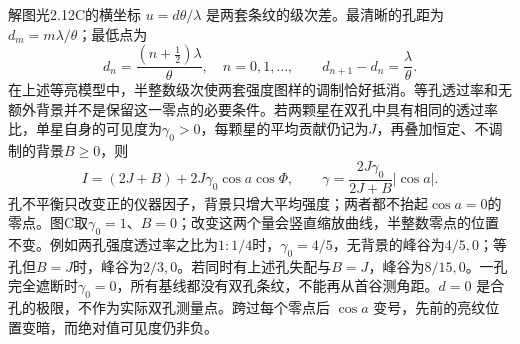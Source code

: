 \documentclass[UTF8,fontset=fandol,a4paper,11pt]{ctexart}
\begin{document}
解图光2.12C的横坐标 $u=d\theta/\lambda$ 是两套条纹的级次差。最清晰的孔距为 $d_m=m\lambda/\theta$；最低点为
\[
d_n=\frac{(n+\tfrac12)\lambda}{\theta},\quad n=0,1,\ldots,\qquad
d_{n+1}-d_n=\frac{\lambda}{\theta}.
\]
在上述等亮模型中，半整数级次使两套强度图样的调制恰好抵消。等孔透过率和无额外背景并不是保留这一零点的必要条件。若两颗星在双孔中具有相同的透过率比，单星自身的可见度为$\gamma_0>0$，每颗星的平均贡献仍记为$J$，再叠加恒定、不调制的背景$B\ge0$，则
\[
I=(2J+B)+2J\gamma_0\cos a\cos\Phi,\qquad
\gamma=\frac{2J\gamma_0}{2J+B}|\cos a|.
\]
孔不平衡只改变正的仪器因子，背景只增大平均强度；两者都不抬起$\cos a=0$的零点。图C取$\gamma_0=1$、$B=0$；改变这两个量会竖直缩放曲线，半整数零点的位置不变。例如两孔强度透过率之比为$1:1/4$时，$\gamma_0=4/5$，无背景的峰谷为$4/5,0$；等孔但$B=J$时，峰谷为$2/3,0$。若同时有上述孔失配与$B=J$，峰谷为$8/15,0$。一孔完全遮断时$\gamma_0=0$，所有基线都没有双孔条纹，不能再从首谷测角距。$d=0$ 是合孔的极限，不作为实际双孔测量点。跨过每个零点后 $\cos a$ 变号，先前的亮纹位置变暗，而绝对值可见度仍非负。
\end{document}

